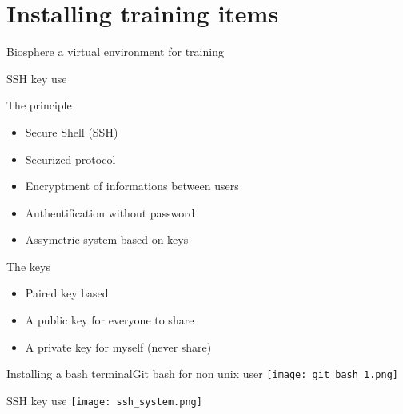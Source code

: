 \section{Installing training items}

\begin{frame}{Biosphere a virtual environment for training}
\end{frame}

\begin{frame}[fragile]{SSH key use}
\begin{block}{The principle}
\begin{itemize}
\item Secure Shell (SSH)
\item Securized protocol
\item Encryptment of informations between users
\item Authentification without password
\item Assymetric system based on keys
\end{itemize}
\end{block}

\begin{block}{The keys}
\begin{itemize}
\item Paired key based
\item A public key for everyone to share
\item A private key for myself (never share)
\end{itemize}
\end{block}
\end{frame}


\begin{frame}{Installing a bash terminal}{Git bash for non unix user}
\centering\texttt{[image: git\_bash\_1.png]}

\end{frame}

\begin{frame}{SSH key use}
\centering\texttt{[image: ssh\_system.png]}
\end{frame}


